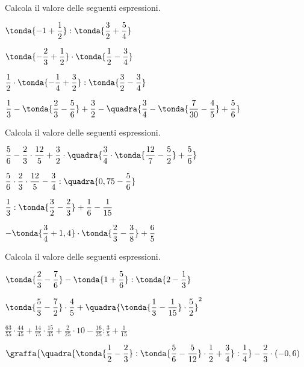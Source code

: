 \begin{esercizio}[*]
\label{ese:3.143}
Calcola il valore delle seguenti espressioni.
\begin{enumeratees}
\spazielenx
\item \(\displaystyle{\tonda{-1+\frac{1}{2}}:\tonda{\frac{3}{2}+
\frac{5}{4}}}\)
\item \(\displaystyle{\tonda{-{\frac{2}{3}}+\frac{1}{2}}\cdot
\tonda{\frac{1}{2}-\frac{3}{4}}}\)
\item \(\displaystyle{\frac{1}{2}\cdot\tonda{-{\frac{1}{4}}+\frac{3}{2}}:
\tonda{\frac{3}{2}-\frac{3}{4}}}\)
\item \(\displaystyle{\frac{1}{3}-\tonda{\frac{2}{3}-\frac{5}{6}}+
\frac{3}{2}-\quadra{\frac{3}{4}-\tonda{\frac{7}{30}%
-\frac{4}{5}}+\frac{5}{6}}}\)
\end{enumeratees}
\end{esercizio}

\begin{esercizio}[*]
\label{ese:3.144}
 Calcola il valore delle seguenti espressioni.
\begin{enumeratees}
\spazielenx
\item \(\displaystyle{\frac{5}{6}-\frac{2}{3}\cdot\frac{12}{5}+\frac{3}{2}
\cdot\quadra{\frac{3}{4}\cdot%
\tonda{\frac{12}{7}-\frac{5}{2}}+\frac{5}{6}}}\)
\item \(\displaystyle{\frac{5}{6}\cdot{\frac{2}{3}}\cdot\frac{12}{5}-
\frac{3}{4}:\quadra{0,75-\frac{5}{6}}}\)
\item \(\displaystyle{\frac{1}{3}:\tonda{\frac{3}{2}-\frac{2}{3}}+
\frac{1}{6}-\frac{1}{15}}\)
\item \(\displaystyle{-\tonda{\frac{3}{4}+1,4}\cdot\tonda{\frac{2}{3}-
\frac{3}{8}}+\frac{6}{5}}\)
\end{enumeratees}
\end{esercizio}

\begin{esercizio}[*]
\label{ese:3.145}
 Calcola il valore delle seguenti espressioni.
\begin{enumeratees}
\spazielenx
\item \(\displaystyle{\tonda{\frac{2}{3}-\frac{7}{6}}-\tonda{1+
\frac{5}{6}}:\tonda{2-\frac{1}{3}}}\)
\item \(\displaystyle{\tonda{\frac{5}{3}-\frac{7}{2}}\cdot\frac{4}{5}+
\quadra{\tonda{\frac{1}{3}-\frac{1}{15}}%
\cdot\frac{5}{2}}^{2}}\)
\item \(\displaystyle{\frac{63}{55}\cdot\frac{44}{45}+\frac{14}{75}\cdot
\frac{15}{35}+\frac{2}{25}\cdot%
10-\frac{16}{25}:\frac{3}{5}+\frac{1}{15}}\)
\item \(\displaystyle{\graffa{\quadra{\tonda{\frac{1}{2}-\frac{2}{3}}:
\tonda{\frac{5}{6}-\frac{5}{12}}\cdot%
\frac{1}{2}+\frac{3}{4}}:\frac{1}{4}}-\frac{2}{3}\cdot(-0,6)}\)
\end{enumeratees}
\end{esercizio}

